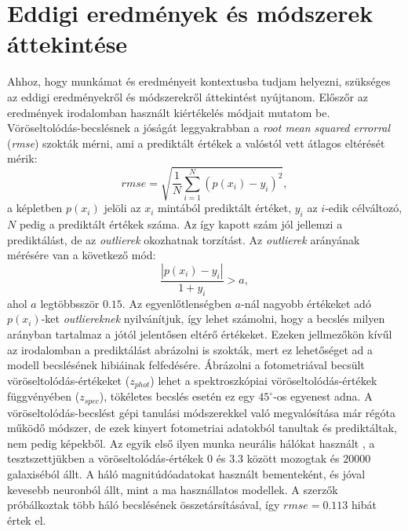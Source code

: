 \documentclass[12pt,letterpaper,oneside,openright]{book}
\begin{document}
\section{Eddigi eredmények és módszerek áttekintése}
Ahhoz, hogy munkámat és eredményeit kontextusba tudjam helyezni, szükséges az eddigi eredményekről és módszerekről áttekintést nyújtanom. Előszőr az eredmények irodalomban használt kiértékelés módjait mutatom be.
\newline\indent
Vöröseltolódás-becslésnek a jóságát leggyakrabban a \textit{root mean squared errorral} (\textit{rmse}) szokták mérni, ami a prediktált értékek a valóstól vett átlagos eltérését mérik:
\begin{equation}
\textit{rmse} = \sqrt{\frac{1}{N}\sum^{N}_{i=1} (p(x_i)-y_i)^2},
\end{equation}
a képletben $p(x_i)$ jelöli az $x_i$ mintából prediktált értéket, $y_i$ az $i$-edik  célváltozó, $N$ pedig a prediktált értékek száma. Az így kapott szám jól jellemzi a prediktálást, de az \textit{outlierek} okozhatnak torzítást. Az \textit{outlierek} arányának mérésére van a következő mód:
\begin{equation}
\frac{|p(x_i)-y_i|}{1 + y_i} > a,
\end{equation}
 ahol $a$ legtöbbsször $0.15$. Az egyenlőtlenségben $a$-nál nagyobb értékeket adó $p(x_i)$-ket \textit{outliereknek} nyilvánítjuk, így lehet számolni, hogy a becslés milyen arányban tartalmaz a jótól jelentősen eltérő értékeket. Ezeken jellmezőkön kívűl az irodalomban a prediktálást abrázolni is szokták, mert ez lehetőséget ad a modell becslésének hibiáinak felfedésére. Ábrázolni a fotometriával becsült vöröseltolódás-értékeket ($z_{phot}$) lehet a spektroszkópiai vöröseltolódás-értékek függvényében ($z_{spec}$), tökéletes becslés esetén ez egy $45^{\circ}$-os egyenest adna. 
 \newline\indent
 A vöröseltolódás-becslést gépi tanulási módszerekkel való megvalósítása már régóta működő módszer, de ezek kinyert fotometriai adatokból tanultak és prediktáltak, nem pedig képekből. Az egyik első ilyen munka neurális hálókat használt \cite{ann1}, a tesztszettjükben a vöröseltolódás-értékek $0$ és $3.3$ között mozogtak és $\num{20000}$ galaxiséból állt. A háló magnitúdóadatokat használt bementeként, és  jóval kevesebb neuronból állt, mint a ma használlatos modellek. A szerzők próbálkoztak több háló becslésének összetársításával, így $\textit{rmse} = 0.113$ hibát értek el.
 \newline\indent
\end{document}
